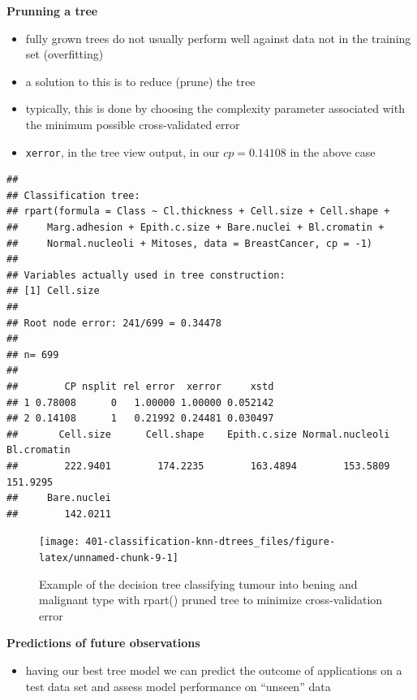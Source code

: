 \documentclass[
]{book}
\providecommand{\tightlist}{%
  \setlength{\itemsep}{0pt}\setlength{\parskip}{0pt}}
\theoremstyle{definition}
\theoremstyle{definition}
\theoremstyle{definition}
\theoremstyle{remark}
\begin{document}
\textbf{Prunning a tree}

\begin{itemize}
\tightlist
\item
  fully grown trees do not usually perform well against data not in the training set (overfitting)
\item
  a solution to this is to reduce (prune) the tree
\item
  typically, this is done by choosing the complexity parameter associated with the minimum possible cross-validated error
\item
  \texttt{xerror}, in the tree view output, in our \(cp = 0.14108\) in the above case
\end{itemize}

\begin{verbatim}
## 
## Classification tree:
## rpart(formula = Class ~ Cl.thickness + Cell.size + Cell.shape + 
##     Marg.adhesion + Epith.c.size + Bare.nuclei + Bl.cromatin + 
##     Normal.nucleoli + Mitoses, data = BreastCancer, cp = -1)
## 
## Variables actually used in tree construction:
## [1] Cell.size
## 
## Root node error: 241/699 = 0.34478
## 
## n= 699 
## 
##        CP nsplit rel error  xerror     xstd
## 1 0.78008      0   1.00000 1.00000 0.052142
## 2 0.14108      1   0.21992 0.24481 0.030497
##       Cell.size      Cell.shape    Epith.c.size Normal.nucleoli     Bl.cromatin 
##        222.9401        174.2235        163.4894        153.5809        151.9295 
##     Bare.nuclei 
##        142.0211
\end{verbatim}

\begin{figure}

{\centering \texttt{[image: 401-classification-knn-dtrees\_files/figure-latex/unnamed-chunk-9-1]} 

}

\caption{Example of the decision tree classifying tumour into bening and malignant type with rpart() pruned tree to minimize cross-validation error}\label{fig:unnamed-chunk-9}
\end{figure}

\textbf{Predictions of future observations}

\begin{itemize}
\tightlist
\item
  having our best tree model we can predict the outcome of applications on a test data set and assess model performance on ``unseen'' data
\end{itemize}
\end{document}
